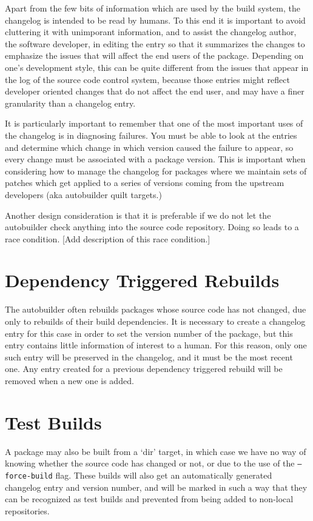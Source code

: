 \documentclass[12pt]{article}
\begin{document}
Apart from the few bits of information which are used by the build
system, the changelog is intended to be read by humans.  To this end
it is important to avoid cluttering it with unimporant information,
and to assist the changelog author, the software developer, in editing
the entry so that it summarizes the changes to emphasize the issues
that will affect the end users of the package.  Depending on one's
development style, this can be quite different from the issues that
appear in the log of the source code control system, because those
entries might reflect developer oriented changes that do not affect
the end user, and may have a finer granularity than a changelog entry.

It is particularly important to remember that one of the most
important uses of the changelog is in diagnosing failures.  You must
be able to look at the entries and determine which change in which
version caused the failure to appear, so every change must be
associated with a package version.  This is important when considering
how to manage the changelog for packages where we maintain sets of
patches which get applied to a series of versions coming from the
upstream developers (aka autobuilder quilt targets.)

Another design consideration is that it is preferable if we do not let
the autobuilder check anything into the source code repository.  Doing
so leads to a race condition.  [Add description of this race condition.]

\section{Dependency Triggered Rebuilds}

The autobuilder often rebuilds packages whose source code has not
changed, due only to rebuilds of their build dependencies.  It is
necessary to create a changelog entry for this case in order to set
the version number of the package, but this entry contains little
information of interest to a human.  For this reason, only one such
entry will be preserved in the changelog, and it must be the most
recent one.  Any entry created for a previous dependency triggered
rebuild will be removed when a new one is added.

\section{Test Builds}

A package may also be built from a `dir' target, in which case we have
no way of knowing whether the source code has changed or not, or due
to the use of the {\tt --force-build} flag.  These builds will also get an
automatically generated changelog entry and version number, and will
be marked in such a way that they can be recognized as test builds and
prevented from being added to non-local repositories.
\end{document}
